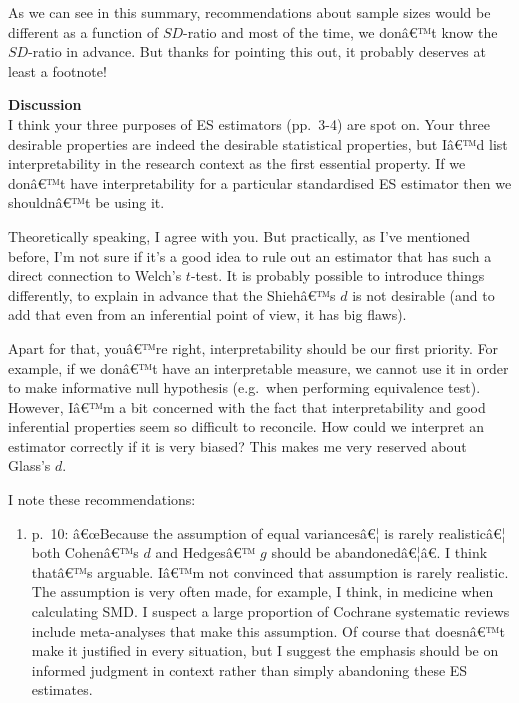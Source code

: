 \begin{appendix}
As we can see in this summary, recommendations about sample sizes would
be different as a function of \(SD\)-ratio and most of the time, we
donâ€™t know the \(SD\)-ratio in advance. But thanks for pointing this
out, it probably deserves at least a footnote!

\color{black} \textbf{Discussion}\\
I think your three purposes of ES estimators (pp.~3-4) are spot on. Your
three desirable properties are indeed the desirable statistical
properties, but Iâ€™d list interpretability in the research context as
the first essential property. If we donâ€™t have interpretability for a
particular standardised ES estimator then we shouldnâ€™t be using it.

\color{blue} Theoretically speaking, I agree with you. But practically,
as I've mentioned before, I'm not sure if it's a good idea to rule out
an estimator that has such a direct connection to Welch's \(t\)-test. It
is probably possible to introduce things differently, to explain in
advance that the Shiehâ€™s \(d\) is not desirable (and to add that even
from an inferential point of view, it has big flaws).

Apart for that, youâ€™re right, interpretability should be our first
priority. For example, if we donâ€™t have an interpretable measure, we
cannot use it in order to make informative null hypothesis (e.g.~when
performing equivalence test). However, Iâ€™m a bit concerned with the
fact that interpretability and good inferential properties seem so
difficult to reconcile. How could we interpret an estimator correctly if
it is very biased? This makes me very reserved about Glass's \(d\).

\color{black} I note these recommendations:

\begin{enumerate}
\def\labelenumi{\arabic{enumi}.}
\tightlist
\item
  p.~10: â€œBecause the assumption of equal variancesâ€¦ is rarely
  realisticâ€¦ both Cohenâ€™s \(d\) and Hedgesâ€™ \(g\) should be
  abandonedâ€¦â€. I think thatâ€™s arguable. Iâ€™m not convinced that
  assumption is rarely realistic. The assumption is very often made, for
  example, I think, in medicine when calculating SMD. I suspect a large
  proportion of Cochrane systematic reviews include meta-analyses that
  make this assumption. Of course that doesnâ€™t make it justified in
  every situation, but I suggest the emphasis should be on informed
  judgment in context rather than simply abandoning these ES estimates.
\end{enumerate}


\end{appendix}
